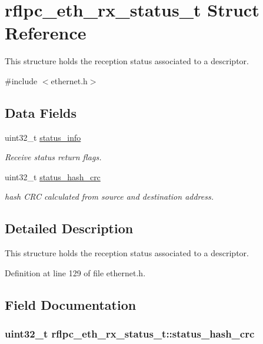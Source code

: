 \hypertarget{structrflpc__eth__rx__status__t}{\section{rflpc\-\_\-eth\-\_\-rx\-\_\-status\-\_\-t Struct Reference}
\label{structrflpc__eth__rx__status__t}
}


This structure holds the reception status associated to a descriptor.  




{\ttfamily \#include $<$ethernet.\-h$>$}

\subsection*{Data Fields}
\begin{DoxyCompactItemize}
\item 
uint32\-\_\-t \hyperlink{structrflpc__eth__rx__status__t_acb6cbccb75a46eae2026c704e4c7d2d2}{status\-\_\-info}
\begin{DoxyCompactList}\small\item\em Receive status return flags. \end{DoxyCompactList}\item 
uint32\-\_\-t \hyperlink{structrflpc__eth__rx__status__t_a8bce302027e1fd2343ef971783807b3f}{status\-\_\-hash\-\_\-crc}
\begin{DoxyCompactList}\small\item\em hash C\-R\-C calculated from source and destination address. \end{DoxyCompactList}\end{DoxyCompactItemize}


\subsection{Detailed Description}
This structure holds the reception status associated to a descriptor. 

Definition at line 129 of file ethernet.\-h.



\subsection{Field Documentation}
\hypertarget{structrflpc__eth__rx__status__t_a8bce302027e1fd2343ef971783807b3f}{
\subsubsection[{status\-\_\-hash\-\_\-crc}]{\setlength{\rightskip}{0pt plus 5cm}uint32\-\_\-t {\bf rflpc\-\_\-eth\-\_\-rx\-\_\-status\-\_\-t\-::status\-\_\-hash\-\_\-crc}}}\label{structrflpc__eth__rx__status__t_a8bce302027e1fd2343ef971783807b3f}



